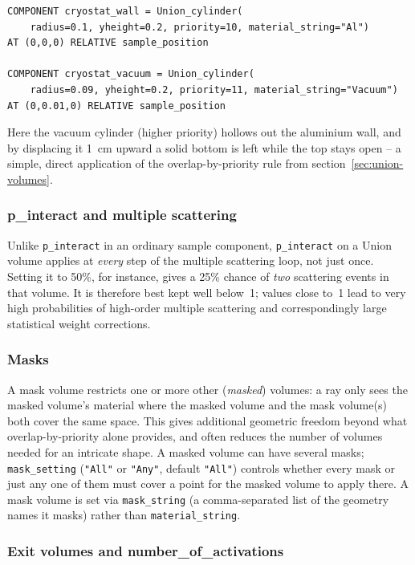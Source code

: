 \begin{lstlisting}
COMPONENT cryostat_wall = Union_cylinder(
    radius=0.1, yheight=0.2, priority=10, material_string="Al")
AT (0,0,0) RELATIVE sample_position

COMPONENT cryostat_vacuum = Union_cylinder(
    radius=0.09, yheight=0.2, priority=11, material_string="Vacuum")
AT (0,0.01,0) RELATIVE sample_position
\end{lstlisting}
Here the vacuum cylinder (higher priority) hollows out the aluminium wall,
and by displacing it 1~cm upward a solid bottom is left while the top stays
open -- a simple, direct application of the overlap-by-priority rule from
section~\ref{sec:union-volumes}.

\subsubsection*{p\_interact and multiple scattering}
Unlike \texttt{p\_interact} in an ordinary \MCS sample component,
\texttt{p\_interact} on a Union volume applies at \emph{every} step of the
multiple scattering loop, not just once. Setting it to 50\%, for instance,
gives a 25\% chance of \emph{two} scattering events in that volume. It is
therefore best kept well below~1; values close to~1 lead to very high
probabilities of high-order multiple scattering and correspondingly large
statistical weight corrections.

\subsubsection{Masks}
\label{sec:union-masks}

A mask volume restricts one or more other (\emph{masked}) volumes: a ray
only sees the masked volume's material where the masked volume and the mask
volume(s) both cover the same space. This gives additional geometric
freedom beyond what overlap-by-priority alone provides, and often reduces
the number of volumes needed for an intricate shape. A masked volume can
have several masks; \texttt{mask\_setting} (\texttt{"All"} or \texttt{"Any"}, default
\texttt{"All"}) controls whether every mask or just any one of them must
cover a point for the masked volume to apply there. A mask volume is set
via \texttt{mask\_string} (a comma-separated list of the geometry names it
masks) rather than \texttt{material\_string}.

\subsubsection{Exit volumes and number\_of\_activations}
\label{sec:union-exit}


